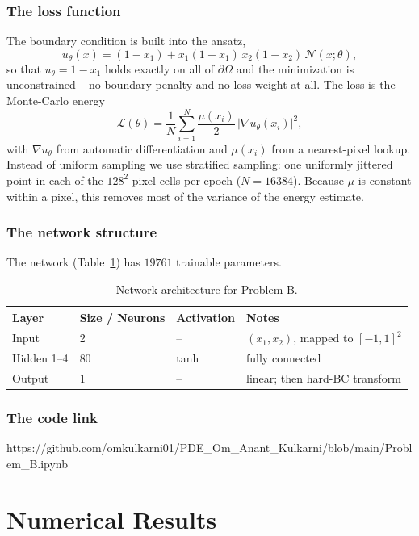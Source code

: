 \subsubsection{The loss function}
The boundary condition is built into the ansatz,
\begin{equation}
    u_\theta(x) = (1 - x_1) + x_1(1-x_1)\,x_2(1-x_2)\,\mathcal{N}(x;\theta),
\end{equation}
so that $u_\theta = 1 - x_1$ holds exactly on all of $\partial\Omega$ and
the minimization is unconstrained -- no boundary penalty and no loss weight
at all. The loss is the Monte-Carlo energy
\begin{equation}
    \mathcal{L}(\theta) = \frac{1}{N}\sum_{i=1}^{N}
    \frac{\mu(x_i)}{2}\,\big|\nabla u_\theta(x_i)\big|^2 ,
\end{equation}
with $\nabla u_\theta$ from automatic differentiation and $\mu(x_i)$ from a
nearest-pixel lookup. Instead of uniform sampling we use stratified
sampling: one uniformly jittered point in each of the $128^2$ pixel cells
per epoch ($N = 16384$). Because $\mu$ is constant within a pixel, this
removes most of the variance of the energy estimate.
%
\subsubsection{The network structure}
The network (Table~\ref{tab:problem_B_net}) has $19761$ trainable
parameters.
%
\begin{table}[htbp]
\centering
\caption{Network architecture for Problem B.}
\label{tab:problem_B_net}
\begin{tabular}{llll}
\hline
\textbf{Layer} & \textbf{Size / Neurons} & \textbf{Activation} & \textbf{Notes} \\
\hline
Input          & 2   & --   & $(x_1,x_2)$, mapped to $[-1,1]^2$ \\
Hidden 1--4    & 80  & tanh & fully connected \\
Output         & 1   & --   & linear; then hard-BC transform \\
\hline
\end{tabular}
\end{table}
%
\subsubsection{The code link}
{https://github.com/omkulkarni01/PDE_Om_Anant_Kulkarni/blob/main/Problem_B.ipynb}
%
\section{Numerical Results}
%
